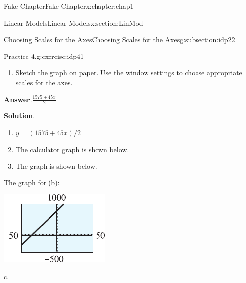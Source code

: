 \documentclass[oneside,10pt,]{book}
\newcommand{\blocktitlefont}{\relax}
\numberwithin{equation}{section}
\begin{document}
\begin{chapterptx}{Fake Chapter}{}{Fake Chapter}{}{}{x:chapter:chap1}
\begin{sectionptx}{Linear Models}{}{Linear Models}{}{}{x:section:LinMod}
\begin{subsectionptx}{Choosing Scales for the Axes}{}{Choosing Scales for the Axes}{}{}{g:subsection:idp22}
\begin{inlineexercise}{Practice 4.}{g:exercise:idp41}
\begin{enumerate}[label=\alph*.]
\begin{sidebyside}{1}{0}{0}{0}
\begin{sbspanel}{1}
{{{\begin{tabular}{lllll}
\end{tabular}
}%
\par}
}%
\end{sbspanel}%
\end{sidebyside}%
\item{}Sketch the graph on paper. Use the window settings to choose appropriate scales for the axes.%
\end{enumerate}
%
\par\smallskip%
\noindent\textbf{\blocktitlefont Answer}.\hypertarget{g:answer:idp42}{}\quad{}\(\frac{1575+45x}{2}\)%
\par\smallskip%
\noindent\textbf{\blocktitlefont Solution}.\hypertarget{g:solution:idp43}{}\quad{}%
\begin{enumerate}[label=\alph*.]
\item{}\(\displaystyle y=(1575+45x)/2\)%
\item{}The calculator graph is shown below.%
\item{}The graph is shown below.%
\end{enumerate}
%
\par\medskip\noindent The graph for (b):%
\begin{sidebyside}{1}{0.05}{0.6}{0}%
\begin{sbspanel}{0.3}%
\includegraphics[width=\linewidth]{external/photos/fig-in-ex-ans-1-1-4b.pdf}
\end{sbspanel}%
\end{sidebyside}%
\par
c.%
\begin{sidebyside}{1}{0.05}{0.65}{0}%
\begin{sbspanel}{0.25}%

\end{sbspanel}
\end{sidebyside}
\end{inlineexercise}
\end{subsectionptx}
\end{sectionptx}
\end{chapterptx}
\end{document}
